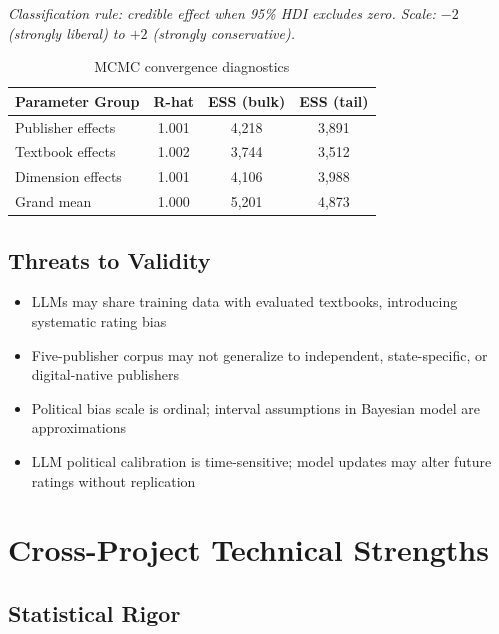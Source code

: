 \documentclass[11pt,a4paper]{article}
\begin{document}
\noindent\textit{Classification rule: credible effect when 95\% HDI excludes zero. Scale: $-2$ (strongly liberal) to $+2$ (strongly conservative).}

\begin{table}[H]
\centering
\caption{MCMC convergence diagnostics}
\begin{tabular}{lccc}
\toprule
\textbf{Parameter Group} & \textbf{R-hat} & \textbf{ESS (bulk)} & \textbf{ESS (tail)} \\
\midrule
Publisher effects & 1.001 & 4,218 & 3,891 \\
Textbook effects & 1.002 & 3,744 & 3,512 \\
Dimension effects & 1.001 & 4,106 & 3,988 \\
Grand mean & 1.000 & 5,201 & 4,873 \\
\bottomrule
\end{tabular}
\label{tab:mcmc}
\end{table}

\subsection{Threats to Validity}

\begin{itemize}[leftmargin=*]
    \item LLMs may share training data with evaluated textbooks, introducing systematic rating bias
    \item Five-publisher corpus may not generalize to independent, state-specific, or digital-native publishers
    \item Political bias scale is ordinal; interval assumptions in Bayesian model are approximations
    \item LLM political calibration is time-sensitive; model updates may alter future ratings without replication
\end{itemize}

\section{Cross-Project Technical Strengths}

\subsection{Statistical Rigor}
\end{document}
